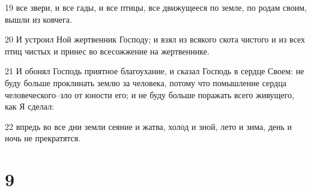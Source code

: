 \par 19 все звери, и все гады, и все птицы, все движущееся по земле, по родам своим, вышли из ковчега.
\par 20 И устроил Ной жертвенник Господу; и взял из всякого скота чистого и из всех птиц чистых и принес во всесожжение на жертвеннике.
\par 21 И обонял Господь приятное благоухание, и сказал Господь в сердце Своем: не буду больше проклинать землю за человека, потому что помышление сердца человеческого--зло от юности его; и не буду больше поражать всего живущего, как Я сделал:
\par 22 впредь во все дни земли сеяние и жатва, холод и зной, лето и зима, день и ночь не прекратятся.

\chapter{9}

